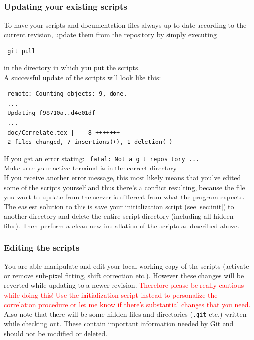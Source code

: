 \documentclass[10pt,a4paper,onepage,DIV12]{scrartcl}
\begin{document}
\subsubsection*{Updating your existing scripts}

To have your scripts and documentation files always up to date according to the current revision, update them from the repository by simply executing
\begin{verbatim}
 git pull
\end{verbatim}
 in the directory in which you put the scripts.\\
 
A successful update of the scripts will look like this:
\begin{verbatim}
 remote: Counting objects: 9, done.
 ...
 Updating f98710a..d4e01df
 ...
 doc/Correlate.tex |    8 +++++++-
 2 files changed, 7 insertions(+), 1 deletion(-)
\end{verbatim}

If you get an error stating: \texttt{
 fatal: Not a git repository ...}\\
Make sure your active terminal is in the correct directory.\\

If you receive another error message, this most likely means that you've edited some of the scripts yourself and thus there's a conflict resulting, because the file you want to update from the server is different from what the program expects. The easiest solution to this is save your initialization script (see \ref{sec:init}) to another directory and delete the entire script directory (including all hidden files). Then perform a clean new installation of the scripts as described above.

\subsubsection*{Editing the scripts}
You are able manipulate and edit your local working copy of the scripts (activate or remove sub-pixel fitting, shift correction etc.). However these changes will be reverted while updating to a newer revision. \textcolor{red}{Therefore please be really cautious while doing this! Use the initialization script instead to personalize the correlation procedure or let me know if there's substantial changes that you need.}\\

Also note that there will be some hidden files and directories (\texttt{.git} etc.) written while checking out. These contain important information needed by Git and should not be modified or deleted.
\end{document}
